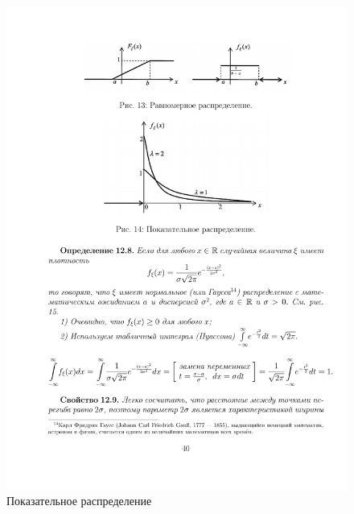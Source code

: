 \begin{figure}[h!]
	\centering
	\includegraphics[]{pic/pic14}
	\caption{Показательное распределение}
	\label{fig14}
\end{figure}

